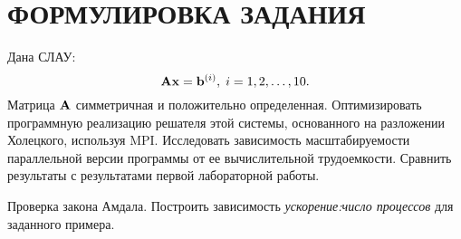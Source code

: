 \section*{ФОРМУЛИРОВКА ЗАДАНИЯ}

Дана СЛАУ:
\begin{equation}
    \label{eq:1}
    \vb{A} \vb{x} = \vb{b}^{(i)},\; i=1,2,\ldots,10.
\end{equation}
Матрица $\vb{A}$ симметричная и положительно определенная. Оптимизировать программную реализацию решателя этой системы, основанного на разложении Холецкого, используя MPI. Исследовать зависимость масштабируемости параллельной версии программы от ее вычислительной трудоемкости. Сравнить результаты с результатами первой лабораторной работы.

Проверка закона Амдала. Построить зависимость \emph{ускорение:число процессов} для заданного примера.